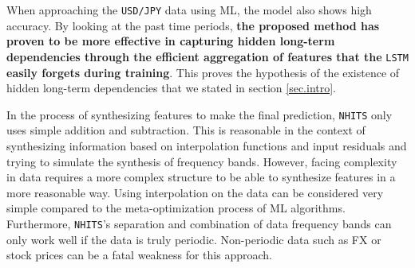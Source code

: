 \documentclass[aps,prb,groupedaddress,twocolumn,showpacs,dvipdfmx,superscriptaddress,pdftex]{revtex4-2}
\begin{document}
\vspace{2mm}


When approaching the \verb|USD/JPY| data using ML, the model also shows high accuracy. By looking at the past time periods, \textbf{the proposed method has proven to be more effective in capturing hidden long-term dependencies through the efficient aggregation of features that the} \verb|LSTM| \textbf{easily forgets during training}. This proves the hypothesis of the existence of hidden long-term dependencies that we stated in section \ref{sec.intro}.


In the process of synthesizing features to make the final prediction, \verb|NHITS| only uses simple addition and subtraction. This is reasonable in the context of synthesizing information based on interpolation functions and input residuals and trying to simulate the synthesis of frequency bands. However, facing complexity in data requires a more complex structure to be able to synthesize features in a more reasonable way. Using interpolation on the data can be considered very simple compared to the meta-optimization process of ML algorithms. Furthermore, \verb|NHITS|'s separation and combination of data frequency bands can only work well if the data is truly periodic. Non-periodic data such as FX or stock prices can be a fatal weakness for this approach.
\end{document}

